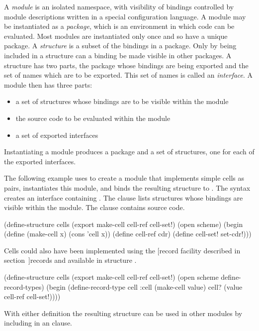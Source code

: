 A {\em module} is an isolated namespace, with visibility of bindings
 controlled by module descriptions written in a special
 configuration language.
A module may be instantiated as a {\em package}, which is an environment
 in which code can be evaluated.
Most modules are instantiated only once and so have a unique package.
A {\em structure} is a subset of the bindings in a package.
Only by being included in a structure can a binding be
 made visible in other packages.
A structure has two parts, the package whose bindings are being exported
 and the set of names which are to be exported.
This set of names is called an {\em interface}.
A module then has three parts:
\begin{itemize}
\item a set of structures whose bindings are to be visible within the module
\item the source code to be evaluated within the module
\item a set of exported interfaces
\end{itemize}
Instantiating a module produces a package and a set of structures, one for
 each of the exported interfaces.

The following example uses  to create a module that
 implements simple cells as pairs, instantiates this module, and binds the
 resulting structure to .
The syntax  creates an interface
 containing .
The  clause lists structures whose bindings are visible
 within the module.
The  clause contains source code.
\begin{example}
(define-structure cells (export make-cell cell-ref cell-set!)
  (open scheme)
  (begin (define (make-cell x)
           (cons 'cell x))
         (define cell-ref cdr)
         (define cell-set! set-cdr!)))
\end{example}

Cells could also have been implemented using the
[record facility described in section~\Ref]{records}
 and available in structure .
\begin{example}
(define-structure cells (export make-cell cell-ref cell-set!)
  (open scheme define-record-types)
  (begin (define-record-type cell :cell
           (make-cell value)
           cell?
           (value cell-ref cell-set!))))
\end{example}

With either definition the resulting structure can be used in other
 modules by including  in an  clause.

